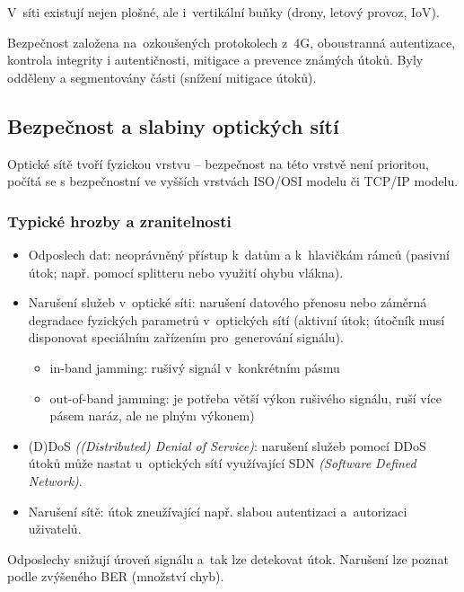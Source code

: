 V~síti existují nejen plošné, ale i~vertikální buňky (drony, letový provoz, IoV).

Bezpečnost založena na~ozkoušených protokolech z~4G, oboustranná autentizace, kontrola integrity i autentičnosti, mitigace a prevence známých útoků.
Byly odděleny a segmentovány části (snížení mitigace útoků).


\subsection{Bezpečnost a slabiny optických sítí}

Optické sítě tvoří fyzickou vrstvu – bezpečnost na této vrstvě není prioritou, počítá se s bezpečnostní ve vyšších vrstvách ISO/OSI modelu či TCP/IP modelu. 


\subsubsection{Typické hrozby a zranitelnosti}

\begin{itemize}
    \item Odposlech dat: neoprávněný přístup k~datům a k~hlavičkám rámců (pasivní útok; např. pomocí splitteru nebo využití ohybu vlákna).
    \item Narušení služeb v~optické síti: narušení datového přenosu nebo záměrná degradace fyzických parametrů v~optických sítí (aktivní útok; útočník musí disponovat speciálním zařízením pro~generování signálu).
    \begin{itemize}
        \item in-band jamming: rušivý signál v~konkrétním pásmu
        \item out-of-band jamming: je potřeba větší výkon rušivého signálu, ruší více pásem naráz, ale ne plným výkonem)
    \end{itemize}
    \item (D)DoS \emph{((Distributed) Denial of Service)}: narušení služeb pomocí DDoS útoků může nastat u~optických sítí využívající SDN \emph{(Software Defined Network)}.
    \item Narušení sítě: útok zneužívající např. slabou autentizaci a~autorizaci uživatelů. 
\end{itemize}

Odposlechy snižují úroveň signálu a~tak lze detekovat útok.
Narušení lze poznat podle zvýšeného BER (množství chyb).

